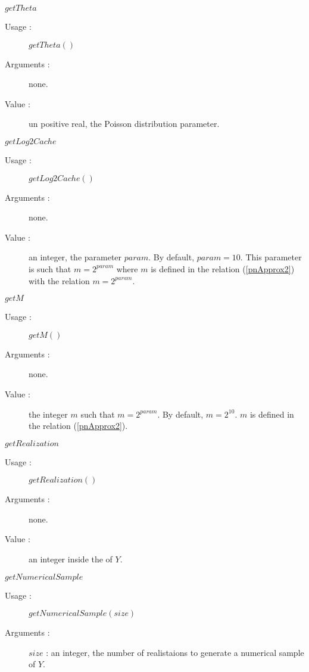 \begin{description}
\begin{description}
  \item $getTheta$
    \begin{description}
    \item[Usage :] $getTheta()$
    \item[Arguments :] none.
    \item[Value :]  un positive real, the Poisson distribution parameter.
    \end{description}
    \bigskip

  \item $getLog2Cache$
    \begin{description}
    \item[Usage :] $getLog2Cache()$
    \item[Arguments :] none.
    \item[Value :]  an integer, the parameter $param$. By default, $param = 10$. This parameter is such that $m = 2^{param}$ where $m$ is defined in the relation (\ref{pnApprox2}) with  the relation $m = 2^{param}$.
    \end{description}
    \bigskip


  \item $getM$
    \begin{description}
    \item[Usage :] $getM()$
    \item[Arguments :] none.
    \item[Value :]  the integer $m$ such that  $m = 2^{param}$. By default, $m=2^{10}$. $m$ is defined in the relation    (\ref{pnApprox2}).
    \end{description}
    \bigskip

  \item $getRealization$
    \begin{description}
    \item[Usage :] $getRealization()$
    \item[Arguments :] none.
    \item[Value :]  an integer inside the of $Y$.
    \end{description}
    \bigskip


  \item $getNumericalSample$
    \begin{description}
    \item[Usage :] $getNumericalSample(size)$
    \item[Arguments :] $size$ : an integer, the number of realistaions to generate a numerical sample of $Y$.
    \end{description}
    \bigskip




\end{description}
\end{description}
